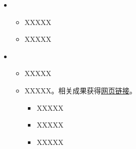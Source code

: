   \begin{itemize}[leftmargin=*]
    \item
      {\small
      \begin{itemize}
          \item XXXXX
          \item XXXXX
      \end{itemize}
      }
    \item
      {\small
      \begin{itemize}
          \item XXXXX
          \item XXXXX。相关成果获得\href{https://google.com}{网页链接}。
          \begin{itemize}
            \item XXXXX
            \item XXXXX
            \item XXXXX
          \end{itemize}
      \end{itemize}
      }
  \end{itemize}

